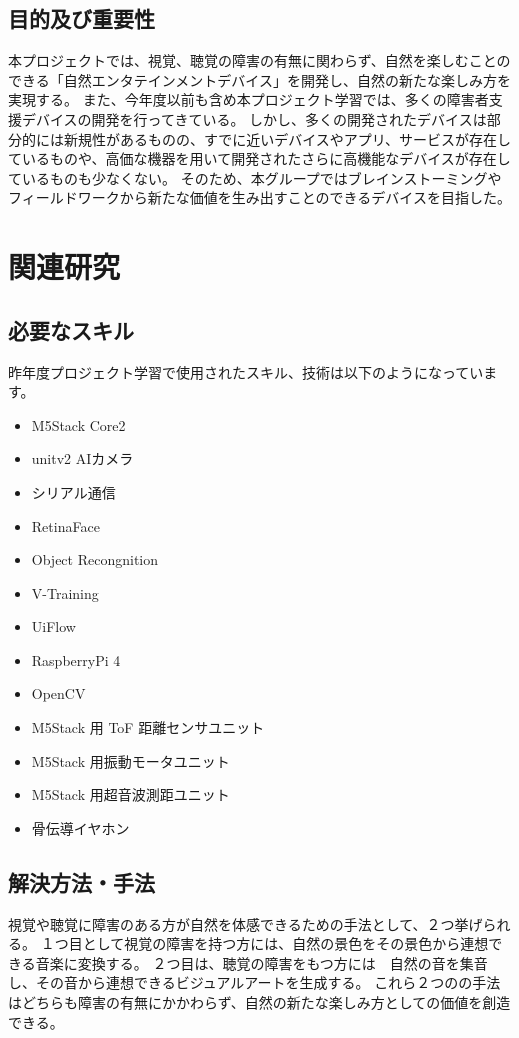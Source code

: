 \section{目的及び重要性}
本プロジェクトでは、視覚、聴覚の障害の有無に関わらず、自然を楽しむことのできる「自然エンタテインメントデバイス」を開発し、自然の新たな楽しみ方を実現する。
また、今年度以前も含め本プロジェクト学習では、多くの障害者支援デバイスの開発を行ってきている。
しかし、多くの開発されたデバイスは部分的には新規性があるものの、すでに近いデバイスやアプリ、サービスが存在しているものや、高価な機器を用いて開発されたさらに高機能なデバイスが存在しているものも少なくない。
そのため、本グループではブレインストーミングやフィールドワークから新たな価値を生み出すことのできるデバイスを目指した。

\chapter{関連研究}
\section{必要なスキル}
昨年度プロジェクト学習で使用されたスキル、技術は以下のようになっています。
\begin{itemize}
  \item M5Stack Core2
  \item unitv2 AIカメラ
  \item シリアル通信
  \item RetinaFace
  \item Object Recongnition
  \item V-Training
  \item UiFlow
  \item RaspberryPi 4
  \item OpenCV
  \item M5Stack 用 ToF 距離センサユニット
  \item M5Stack 用振動モータユニット
  \item M5Stack 用超音波測距ユニット
  \item 骨伝導イヤホン
\end{itemize}

\section{解決方法・手法}
視覚や聴覚に障害のある方が自然を体感できるための手法として、２つ挙げられる。
１つ目として視覚の障害を持つ方には、自然の景色をその景色から連想できる音楽に変換する。
２つ目は、聴覚の障害をもつ方には　自然の音を集音し、その音から連想できるビジュアルアートを生成する。
これら２つのの手法はどちらも障害の有無にかかわらず、自然の新たな楽しみ方としての価値を創造できる。

